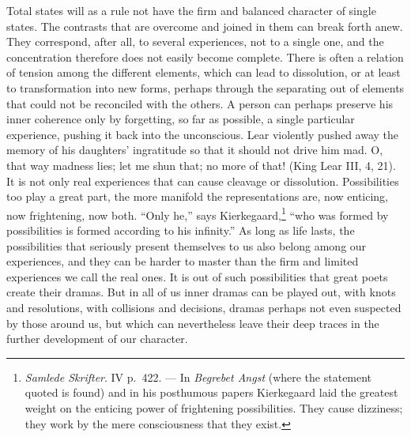 \documentclass[12pt]{book}
\newcommand{\opage}[1]{\marginnote{\footnotesize\textit{[#1]}}}
\begin{document}
Total states will as a rule not have the firm and balanced character of single
states. The contrasts that are overcome and joined in them can break forth anew.
They correspond, after all, to several experiences, not to a single one, and the
concentration therefore does not easily become complete. There is often a
relation of tension among the different elements, which can lead to dissolution,
or at least to transformation into new forms, perhaps through the separating out
of elements that could not be reconciled with the others. A person can perhaps
preserve his inner coherence only by forgetting, so far as possible, a single
particular experience, pushing it back into the unconscious. Lear violently
pushed away the memory of his daughters' ingratitude so that it should not drive
him mad. O, that way madness lies; let me shun that; no more of that! (King Lear
III, 4, 21). It is not only real experiences that can cause cleavage or
dissolution. Possibilities too play a great part, the more manifold the
representations are, now enticing, now frightening, now both. ``Only he,'' says
Kierkegaard,\footnote{\textit{Samlede Skrifter}. IV p.~422. --- In
\textit{Begrebet Angst} (where the statement quoted is found) and in his
posthumous papers Kierkegaard laid the greatest weight on the enticing power of
frightening possibilities. They cause dizziness; they work by the mere
consciousness that they exist.}
``who was formed by possibilities is formed according to his infinity.'' As long
as life lasts, the possibilities that seriously present themselves to us also
belong among our experiences, and they \opage{22}can be harder to master than the
firm and limited experiences we call the real ones. It is out of such
possibilities that great poets create their dramas. But in all of us inner dramas
can be played out, with knots and resolutions, with collisions and decisions,
dramas perhaps not even suspected by those around us, but which can nevertheless
leave their deep traces in the further development of our character.
\end{document}
